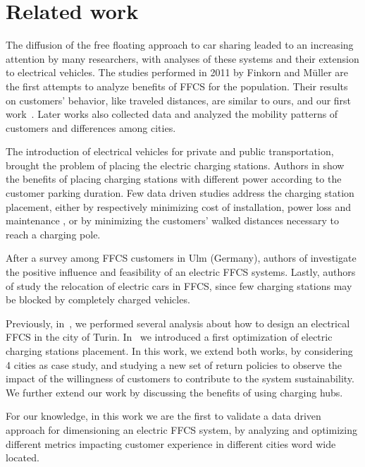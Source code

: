 \section{Related work}
\label{sec:related}

The diffusion of the free floating approach to car sharing leaded to an increasing attention by many researchers, with  analyses of
these systems and their extension to electrical vehicles. 
The studies performed  in 2011 by Finkorn and M\"{u}ller \cite{Firnkorn2011,FM12} are the first attempts to analyze benefits of FFCS for the population. Their results on customers' behavior, like traveled distances, are similar to ours, and our first work~\cite{UMAP}.
Later works \cite{Car2GoGlobalAnalysis,CSandSocial,Schmoller2015} also collected data and analyzed the mobility patterns of customers and differences among cities.

The introduction of electrical vehicles for private and public transportation, brought the problem of placing the electric charging stations. Authors in \cite{ChargingStationForVehicularNetworks} show the benefits of placing charging stations with different power according to the customer parking duration. 
Few data driven studies address the charging station placement, either by respectively minimizing  cost of installation, power loss and maintenance  \cite{PlacementAndPowergrid,mipCSPpechino}, or by minimizing the customers' walked distances necessary to reach a charging pole\cite{placementAustin}. 

After a survey among FFCS customers in Ulm (Germany), authors of \cite{FM15}  investigate the positive influence and feasibility of an electric FFCS systems.
Lastly, authors of \cite{WB15} study the relocation of electric cars in FFCS, since few charging stations may be blocked by completely charged vehicles. 

Previously, in~\cite{taormina}, we performed several analysis about how to design an electrical FFCS in the city of Turin. In~\cite{maui} we introduced a first optimization of electric charging stations placement. In this work, we extend both works, by considering 4 cities as case study, and studying a new set of return policies to observe the impact of the willingness of customers to contribute to the system sustainability. We further extend our work by discussing the benefits of using charging hubs.

For our knowledge, in this work we are the first to validate a data driven approach for dimensioning an electric FFCS system, by analyzing and optimizing different metrics impacting customer experience in different cities word wide located.


